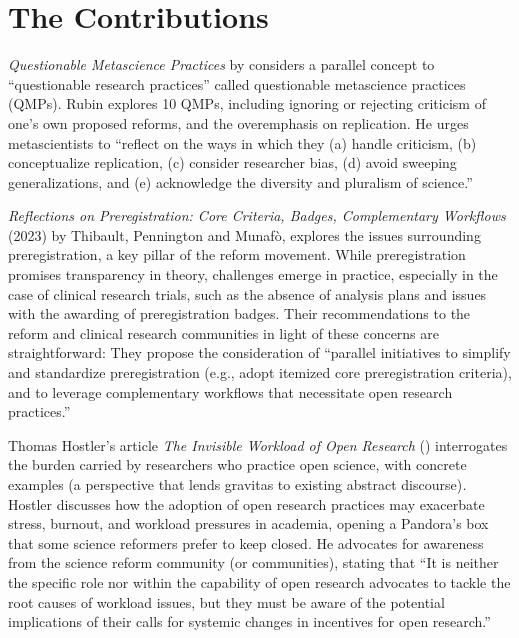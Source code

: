 \documentclass[authordate, editorial,noabstract]{jote-new-article}
\begin{document}
\section{The Contributions}



\emph{Questionable Metascience Practices} by \textcite{Rubin2023} considers a parallel concept to “questionable research practices” called questionable metascience practices (QMPs). Rubin explores 10 QMPs, including ignoring or rejecting criticism of one's own proposed reforms, and the overemphasis on replication. He urges metascientists to “reflect on the ways in which they (a) handle criticism, (b) conceptualize replication, (c) consider researcher bias, (d) avoid sweeping generalizations, and (e) acknowledge the diversity and pluralism of science.”



\emph{Reflections on Preregistration: Core Criteria, Badges, Complementary Workflows }(2023) by Thibault, Pennington and Munafò, explores the issues surrounding preregistration, a key pillar of the reform movement. While preregistration promises transparency in theory, challenges emerge in practice, especially in the case of clinical research trials, such as the absence of analysis plans and issues with the awarding of preregistration badges. Their recommendations to the reform and clinical research communities in light of these concerns are straightforward: They propose the consideration of “parallel initiatives to simplify and standardize preregistration (e.g., adopt itemized core preregistration criteria), and to leverage complementary workflows that necessitate open research practices.”



Thomas Hostler's article \emph{The Invisible Workload of Open Research} (\hspace*{-2pt}\citeyear{Hostler2023}) interrogates the burden carried by researchers who practice open science, with concrete examples (a perspective that lends gravitas to existing abstract discourse)\emph{.} Hostler discusses how the adoption of open research practices may exacerbate stress, burnout, and workload pressures in academia, opening a Pandora's box that some science reformers prefer to keep closed. He advocates for awareness from the science reform community (or communities), stating that “It is neither the specific role nor within the capability of open research advocates to tackle the root causes of workload issues, but they must be aware of the potential implications of their calls for systemic changes in incentives for open research.”
\end{document}
